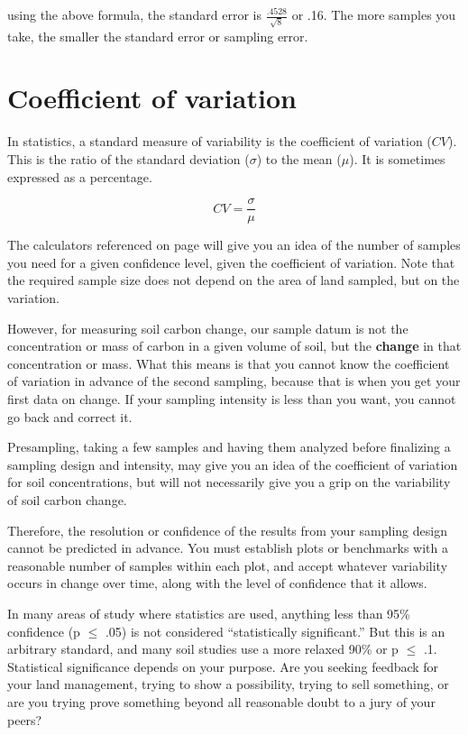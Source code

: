 \documentclass[11pt,letterpaper,oneside,onecolumn]{memoir}
\begin{document}
\noindent using the above formula, the standard error is $\frac{.4528}{\sqrt{8}}$ or .16. The more samples you take, the smaller the standard error or sampling error.


\section{Coefficient of variation}

In statistics, a standard measure of variability is the \label{CV}coefficient of variation ($CV$). This is the ratio of the standard deviation ($\sigma$) to the mean ($\mu$). It is sometimes expressed as a percentage.

\begin{equation}CV = \frac{\sigma}{\mu}\end{equation}

\noindent The calculators referenced on page \pageref{spreadsheet tools} will give you an idea of the number of samples you need for a given confidence level, given the coefficient of variation. Note that the required sample size does not depend on the area of land sampled, but on the variation.

However, for measuring soil carbon change, our sample datum is not the concentration or mass of carbon in a given volume of soil, but the \textbf{change} in that concentration or mass. What this means is that you cannot know the coefficient of variation in advance of the second sampling, because that is when you get your first data on change. If your sampling intensity is less than you want, you cannot go back and correct it.

Presampling, taking a few samples and having them analyzed before finalizing a sampling design and intensity, may give you an idea of the coefficient of variation for soil concentrations, but will not necessarily give you a grip on the variability of soil carbon change.

Therefore, the resolution or confidence of the results from your sampling design cannot be predicted in advance. You must establish plots or benchmarks with a reasonable number of samples within each plot, and accept whatever variability occurs in change over time, along with the level of confidence that it allows.

In many areas of study where statistics are used, anything less than 95\% confidence (p $\le$ .05) is not considered ``statistically significant.'' But this is an arbitrary standard, and many soil studies use a more relaxed 90\% or p $\le$ .1. Statistical significance depends on your purpose. Are you seeking feedback for your land management, trying to show a possibility, trying to sell something, or are you trying prove something beyond all reasonable doubt to a jury of your peers?
\end{document}
